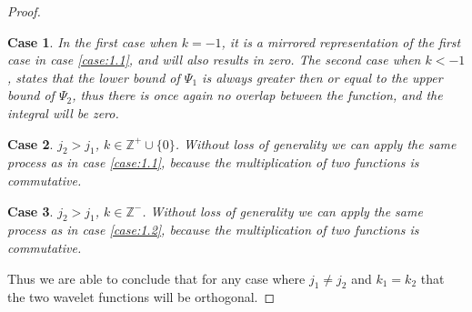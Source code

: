\documentclass[12pt]{amsart}
\newcommand{\Z}{\mathbb{Z}}
\newtheorem{case}{Case}
\begin{document}
\begin{proof}
\begin{case}
    In the first case when $k=-1$, it is a mirrored representation of the
    first case in case \ref{case:1.1}, and will also results in zero. The
    second case when $k<-1$, states that the lower bound of $\Psi_1$ is always
    greater then or equal to the upper bound of $\Psi_2$, thus there is once
    again no overlap between the function, and the integral will be zero.
  \end{case}
  \begin{case}\label{case:1.3}
    $j_2>j_1$, $k\in \Z^+ \cup \{0\}$. Without loss of generality we can apply
    the same process as in case \ref{case:1.1}, because the multiplication of
    two functions is commutative.
  \end{case}
  \begin{case}\label{case:1.4}
    $j_2>j_1$, $k\in \Z^-$. Without loss of generality we can apply
    the same process as in case \ref{case:1.2}, because the multiplication of
    two functions is commutative.
  \end{case}

  Thus we are able to conclude that for any case where $j_1 \neq j_2$ and
  $k_1=k_2$ that the two wavelet functions will be orthogonal.
\end{proof}
\end{document}
